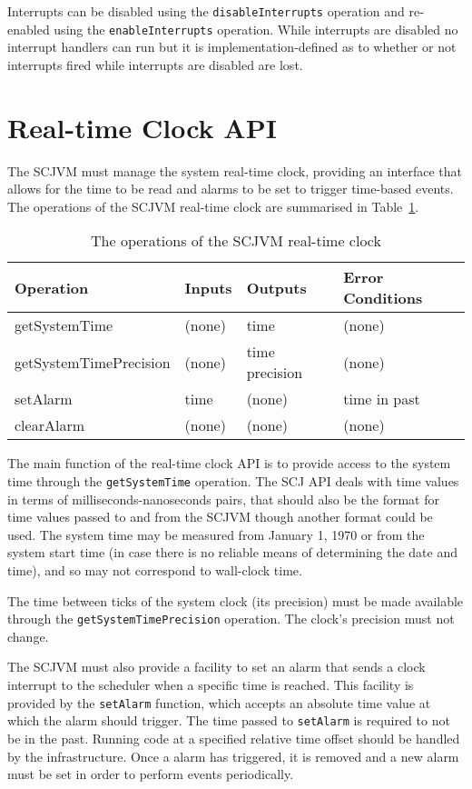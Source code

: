 \documentclass[a4paper,10pt]{report}
\begin{document}
Interrupts can be disabled using the \texttt{disable\-Interrupts}
operation and re-enabled using the \texttt{enable\-Interrupts}
operation.
While interrupts are disabled no interrupt handlers can run but it is
implemen\-tation-defined as to whether or not interrupts fired while
interrupts are disabled are lost.

\section{Real-time Clock API}
\label{realtime-clock-section}

The SCJVM must manage the system real-time clock, providing an
interface that allows for the time to be read and alarms to be set to
trigger time-based events.
The operations of the SCJVM real-time clock are summarised in
Table~\ref{realtime-clock-table}.

\begin{table}[ht]
  \centering
  \footnotesize
  \begin{tabular}{|l|p{0.9cm}|p{1.8cm}|p{2.3cm}|}
    Operation & Inputs & Outputs & Error Conditions \\
    \hline
    getSystemTime &
    (none) &
    time &
    (none)
    \\getSystemTimePrecision &
    (none) &
    time precision &
    (none)
    \\setAlarm &
    time &
    (none) &
    time in past
    \\clearAlarm &
    (none) &
    (none) &
    (none)
  \end{tabular}
  \caption{The operations of the SCJVM real-time clock}
  \label{realtime-clock-table}
\end{table}

The main function of the real-time clock API is to provide access to
the system time through the \texttt{get\-System\-Time} operation.
The SCJ API deals with time values in terms of
milliseconds-nanoseconds pairs, that should also be the format for
time values passed to and from the SCJVM though another format could
be used.
The system time may be measured from January 1, 1970 or from the
system start time (in case there is no reliable means of determining
the date and time), and so may not correspond to wall-clock time.

The time between ticks of the system clock (its precision) must be
made available through the \texttt{get\-System\-Time\-Precision}
operation.
The clock's precision must not change.

The SCJVM must also provide a facility to set an alarm that sends a
clock interrupt to the scheduler when a specific time is reached.
This facility is provided by the \texttt{set\-Alarm} function, which
accepts an absolute time value at which the alarm should trigger.
The time passed to \texttt{set\-Alarm} is required to not be in the
past.
Running code at a specified relative time offset should be handled by
the infrastructure.
Once a alarm has triggered, it is removed and a new alarm must be set
in order to perform events periodically.
\end{document}

